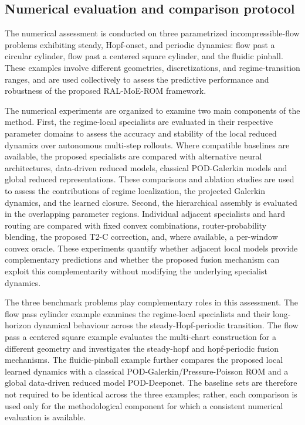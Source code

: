 \subsection{Numerical evaluation and comparison protocol}
\label{subsec:numerical_evaluation_protocol}

The numerical assessment is conducted on three parametrized incompressible-flow
problems exhibiting steady, Hopf-onset, and periodic dynamics: flow past a
circular cylinder, flow past a centered square cylinder, and the fluidic
pinball. These examples involve different geometries, discretizations, and
regime-transition ranges, and are used collectively to assess the predictive
performance and robustness of the proposed RAL-MoE-ROM framework.

The numerical experiments are organized to examine two main components of the
method. First, the regime-local specialists are evaluated in their respective
parameter domains to assess the accuracy and stability of the local reduced
dynamics over autonomous multi-step rollouts. Where compatible baselines are
available, the proposed specialists are compared with alternative neural
architectures, data-driven reduced models, classical POD-Galerkin models and
global reduced representations. These comparisons and ablation studies are
used to assess the contributions of regime localization, the projected
Galerkin dynamics, and the learned closure. Second, the hierarchical assembly
is evaluated in the overlapping parameter regions. Individual adjacent
specialists and hard routing are compared with fixed convex combinations,
router-probability blending, the proposed T2-C correction, and, where
available, a per-window convex oracle. These experiments quantify whether
adjacent local models provide complementary predictions and whether the
proposed fusion mechanism can exploit this complementarity without modifying
the underlying specialist dynamics.

The three benchmark problems play complementary roles in this assessment. The
flow pass cylinder example examines the regime-local specialists and their
long-horizon dynamical behaviour across the steady-Hopf-periodic transition.
The flow pass a centered square example evaluates the multi-chart construction
for a different geometry and investigates the steady-hopf and hopf-periodic fusion mechanisms.
The fluidic-pinball example further compares the proposed local learned
dynamics with a classical POD-Galerkin/Pressure-Poisson ROM and a global
data-driven reduced model POD-Deeponet. The baseline sets are therefore not required to be
identical across the three examples; rather, each comparison is used only for
the methodological component for which a consistent numerical evaluation is
available.


